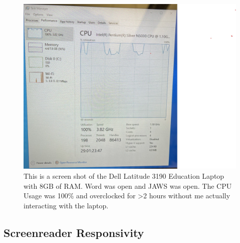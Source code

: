 \documentclass[14pt, letterpaper,twoside]{extreport}
\begin{document}
\pagebreak \begin{figure}[!h]
	\centering
	\includegraphics[width=.75\textwidth]{images/LaptopRunningJAWS.jpg}
	\caption[CPU Usage while running JAWS]{This is a screen shot of the Dell Latitude 3190 Education Laptop with 8GB of RAM. Word was open and JAWS was open. The CPU Usage was 100\% and overclocked for \textgreater2 hours without me actually interacting with the laptop.}
	\label{fig:figure 2}
\end{figure}

\pagebreak
\pagebreak
\hypertarget{screenreader-response}{%
	\subsection*{Screenreader Responsivity}\label{screenreader-response}}
\end{document}
